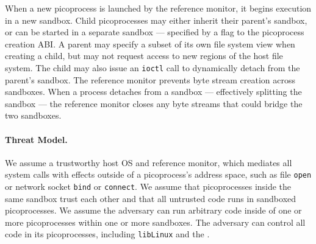 

When a new picoprocess is launched by the reference monitor, it begins execution in 
a new sandbox.  
Child picoprocesses may either inherit their parent's sandbox, 
or can be started in a separate sandbox
--- specified by a flag to the picoprocess creation ABI.
A parent may specify a subset of its own file system view 
when creating a child, but may not request access to new regions of the 
host file system. 
The child may also issue an {\tt ioctl} call to 
dynamically detach from the parent's sandbox. The reference monitor prevents byte stream creation 
across sandboxes.
When a process detaches from a sandbox --- effectively splitting the sandbox ---
the reference monitor closes
any byte streams that could bridge the two sandboxes.

\paragraph{Threat Model.}
We assume  a trustworthy host OS and reference monitor,
which mediates all system calls with effects outside of a picoprocess's address space,
such as file {\tt open} or network socket {\tt bind} or {\tt connect}.
We assume that picoprocesses inside the same sandbox trust each other and that all untrusted code runs in sandboxed picoprocesses.
We assume the adversary can run arbitrary code inside of
one or more picoprocesses within one or more sandboxes.
The adversary can control all code in its
picoprocesses, including {\tt libLinux} and the \pal{}. 


